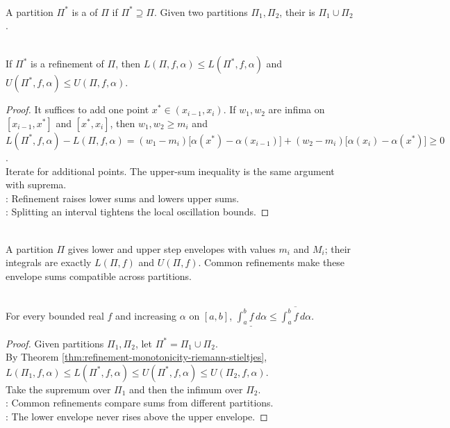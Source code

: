 \begin{definition} \label{def:partition-refinement} \\
A partition $\Pi^\ast$ is a  of $\Pi$ if $\Pi^\ast\supseteq \Pi$. Given two partitions $\Pi_1,\Pi_2$, their  is $\Pi_1\cup \Pi_2$.
\end{definition}

\begin{theorem} \label{thm:refinement-monotonicity-riemann-stieltjes} \\
If $\Pi^\ast$ is a refinement of $\Pi$, then $L(\Pi,f,\alpha)\leq L(\Pi^\ast,f,\alpha)$ and $U(\Pi^\ast,f,\alpha)\leq U(\Pi,f,\alpha)$.
\begin{proof}
It suffices to add one point $x^\ast\in(x_{i-1},x_i)$. If $w_1,w_2$ are infima on $[x_{i-1},x^\ast]$ and $[x^\ast,x_i]$, then $w_1,w_2\geq m_i$ and $L(\Pi^\ast,f,\alpha)-L(\Pi,f,\alpha) =(w_1-m_i)\bigl[\alpha(x^\ast)-\alpha(x_{i-1})\bigr] +(w_2-m_i)\bigl[\alpha(x_i)-\alpha(x^\ast)\bigr]\geq0$.\\
Iterate for additional points. The upper-sum inequality is the same argument with suprema.\\
: Refinement raises lower sums and lowers upper sums.\\
: Splitting an interval tightens the local oscillation bounds.
\end{proof}
\end{theorem}

\begin{perspective} \label{per:piecewise-constant-envelope-view} \\
A partition $\Pi$ gives lower and upper step envelopes with values $m_i$ and $M_i$; their integrals are exactly $L(\Pi,f)$ and $U(\Pi,f)$. Common refinements make these envelope sums compatible across partitions.
\end{perspective}

\begin{theorem} \label{thm:lower-integral-below-upper-integral} \\
For every bounded real $f$ and increasing $\alpha$ on $[a,b]$, $\underline{\int_a^b f\,d\alpha}\leq \overline{\int_a^b f\,d\alpha}$.
\begin{proof}
Given partitions $\Pi_1,\Pi_2$, let $\Pi^\ast=\Pi_1\cup \Pi_2$.\\
By Theorem \ref{thm:refinement-monotonicity-riemann-stieltjes}, $L(\Pi_1,f,\alpha)\leq L(\Pi^\ast,f,\alpha)\leq U(\Pi^\ast,f,\alpha)\leq U(\Pi_2,f,\alpha)$.\\
Take the supremum over $\Pi_1$ and then the infimum over $\Pi_2$.\\
: Common refinements compare sums from different partitions.\\
: The lower envelope never rises above the upper envelope.
\end{proof}
\end{theorem}

